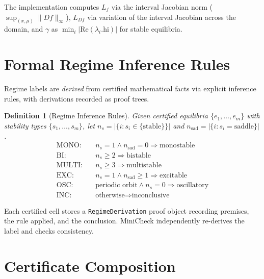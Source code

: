 \documentclass[11pt]{article}
\newtheorem{definition}[theorem]{Definition}
\newcommand{\norm}[1]{\|#1\|}
\begin{document}
The implementation computes $L_f$ via the interval Jacobian norm ($\sup_{(x,\mu)} \norm{Df}_\infty$), $L_{Df}$ via variation of the interval Jacobian across the domain, and $\gamma$ as $\min_i |\mathrm{Re}(\lambda_i.\mathrm{hi})|$ for stable equilibria.

\section{Formal Regime Inference Rules}
\label{sec:regime}

Regime labels are \emph{derived} from certified mathematical facts via explicit inference rules, with derivations recorded as proof trees.

\begin{definition}[Regime Inference Rules]
Given certified equilibria $\{e_1, \ldots, e_m\}$ with stability types $\{s_1, \ldots, s_m\}$, let $n_s = |\{i : s_i \in \{\text{stable}\}\}|$ and $n_{\mathrm{sad}} = |\{i : s_i = \text{saddle}\}|$.
\begin{align*}
\text{MONO:} &\quad n_s = 1 \wedge n_{\mathrm{sad}} = 0 \Rightarrow \text{monostable} \\
\text{BI:}   &\quad n_s \geq 2 \Rightarrow \text{bistable} \\
\text{MULTI:}&\quad n_s \geq 3 \Rightarrow \text{multistable} \\
\text{EXC:}  &\quad n_s = 1 \wedge n_{\mathrm{sad}} \geq 1 \Rightarrow \text{excitable} \\
\text{OSC:}  &\quad \text{periodic orbit} \wedge n_s = 0 \Rightarrow \text{oscillatory} \\
\text{INC:}  &\quad \text{otherwise} \Rightarrow \text{inconclusive}
\end{align*}
\end{definition}

Each certified cell stores a \texttt{RegimeDerivation} proof object recording premises, the rule applied, and the conclusion.
MiniCheck independently re-derives the label and checks consistency.

\section{Certificate Composition}
\label{sec:composition}
\end{document}
